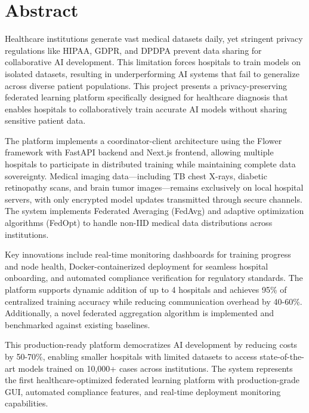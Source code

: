 \chapter*{Abstract}
\thispagestyle{empty}

Healthcare institutions generate vast medical datasets daily, yet stringent privacy regulations like HIPAA, GDPR, and DPDPA prevent data sharing for collaborative AI development. This limitation forces hospitals to train models on isolated datasets, resulting in underperforming AI systems that fail to generalize across diverse patient populations. This project presents a privacy-preserving federated learning platform specifically designed for healthcare diagnosis that enables hospitals to collaboratively train accurate AI models without sharing sensitive patient data.

The platform implements a coordinator-client architecture using the Flower framework with FastAPI backend and Next.js frontend, allowing multiple hospitals to participate in distributed training while maintaining complete data sovereignty. Medical imaging data—including TB chest X-rays, diabetic retinopathy scans, and brain tumor images—remains exclusively on local hospital servers, with only encrypted model updates transmitted through secure channels. The system implements Federated Averaging (FedAvg) and adaptive optimization algorithms (FedOpt) to handle non-IID medical data distributions across institutions.

Key innovations include real-time monitoring dashboards for training progress and node health, Docker-containerized deployment for seamless hospital onboarding, and automated compliance verification for regulatory standards. The platform supports dynamic addition of up to 4 hospitals and achieves 95\% of centralized training accuracy while reducing communication overhead by 40-60\%. Additionally, a novel federated aggregation algorithm is implemented and benchmarked against existing baselines.

This production-ready platform democratizes AI development by reducing costs by 50-70\%, enabling smaller hospitals with limited datasets to access state-of-the-art models trained on 10,000+ cases across institutions. The system represents the first healthcare-optimized federated learning platform with production-grade GUI, automated compliance features, and real-time deployment monitoring capabilities.
